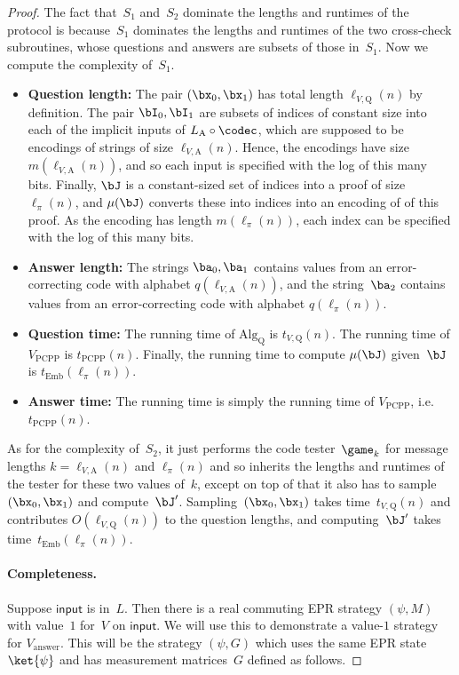 \begin{proof}
The fact  that~$S_1$ and~$S_2$ dominate the lengths and runtimes of the protocol
is because~$S_1$ dominates the lengths and runtimes of the two cross-check subroutines,
whose questions and answers are subsets of those in~$S_1$.
Now we compute the complexity of~$S_1$.
\begin{itemize}
\item[$\circ$] \textbf{Question length:} The pair $(\bx_0, \bx_1)$ has total length $\ell_{V,\mathrm{Q}}(n)$ by definition.
		The pair $\bI_0, \bI_1$ are subsets of indices of constant size into each of the implicit inputs of $L_{\mathrm{A}} \circ \codec$,
		which are supposed to be encodings of strings of size $\ell_{V, \mathrm{A}}(n)$.
		Hence, the encodings have size $m(\ell_{V, \mathrm{A}}(n))$, and so each input is specified with the log of this many bits.
		Finally, $\bJ$ is a constant-sized set of indices into a proof of size $\ell_{\pi}(n)$, and $\mu(\bJ)$ converts these into indices into an encoding of of this proof.
		As the encoding has length $m(\ell_{\pi}(n))$, each index can be specified with the log of this many bits.
\item[$\circ$] \textbf{Answer length:} The strings $\ba_0, \ba_1$ contains values from an error-correcting code with alphabet $q(\ell_{V, \mathrm{A}}(n))$,
		and the string~$\ba_2$ contains values from an error-correcting code with alphabet $q(\ell_{\pi}(n))$.
\item[$\circ$] \textbf{Question time:} The running time of $\mathrm{Alg}_{\mathrm{Q}}$ is $t_{V,\mathrm{Q}}(n)$.
		The running time of $V_{\mathrm{PCPP}}$ is $t_{\mathrm{PCPP}}(n)$.
		Finally, the running time to compute $\mu(\bJ)$ given~$\bJ$ is $t_{\mathrm{Emb}}(\ell_{\pi}(n))$.
\item[$\circ$] \textbf{Answer time:} The running time is simply the running time of $V_{\mathrm{PCPP}}$, i.e.\ $t_{\mathrm{PCPP}}(n)$.
\end{itemize}
As for the complexity of~$S_2$, it just performs the code tester~$\game_k$ for message lengths $k = \ell_{V, \mathrm{A}}(n)$ and $\ell_\pi(n)$ and so inherits the lengths and runtimes of the tester for these two values of~$k$, except on top of that it also has to sample~$(\bx_0, \bx_1)$ and compute~$\bJ'$.
Sampling~$(\bx_0, \bx_1)$ takes time~$t_{V,\mathrm{Q}}(n)$ and contributes $O(\ell_{V, \mathrm{Q}}(n))$ to the question lengths,
and computing~$\bJ'$ takes time~$t_{\mathrm{Emb}}(\ell_{\pi}(n))$.

\paragraph{Completeness.}
Suppose $\mathsf{input}$ is in~$L$.
Then there is a real commuting EPR strategy $(\psi, M)$ with value~$1$ for~$V$ on $\mathsf{input}$.
We will use this to demonstrate a value-$1$ strategy for $V_{\mathrm{answer}}$.
This will be the strategy $(\psi, G)$ which uses the same EPR state $\ket{\psi}$ and has measurement matrices~$G$ defined as follows.


\end{proof}
